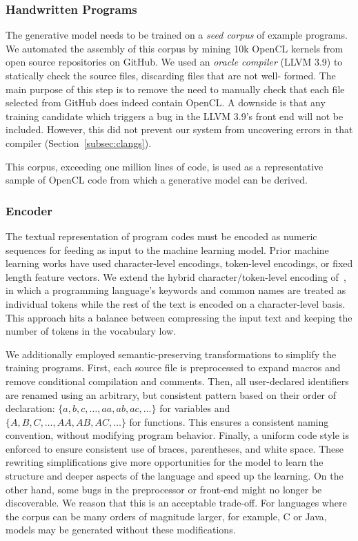 \subsubsection{Handwritten Programs}

The generative model needs to be trained on a \emph{seed corpus} of example
programs. We automated the assembly of this corpus by mining 10k OpenCL kernels
from open source repositories on GitHub. We used an \emph{oracle compiler} (LLVM
3.9) to statically check the source files, discarding files that are not well-
formed. The main purpose of this step is to remove the need to manually check
that each file selected from GitHub does indeed contain OpenCL. A downside is
that any training candidate which triggers a bug in the LLVM 3.9's front end
will not be included. However, this did not prevent our system from uncovering
errors in that compiler (Section~\ref{subsec:clangs}).

This corpus, exceeding one million lines of code, is used as a representative
sample of OpenCL code from which a generative model can be derived.

\subsubsection{Encoder}

The textual representation of program codes must be encoded as numeric sequences
for feeding as input to the machine learning model. Prior machine learning works
have used character-level encodings, token-level encodings, or fixed length
feature vectors. We extend the hybrid character/token-level encoding
of~\cite{Cummins2017b}, in which a programming language's keywords and common
names are treated as individual tokens while the rest of the text is encoded on
a character-level basis. This approach hits a balance between compressing the
input text and keeping the number of tokens in the vocabulary low.

We additionally employed semantic-preserving transformations to simplify the
training programs. First, each source file is preprocessed to expand macros and
remove conditional compilation and comments. Then, all user-declared identifiers
are renamed using an arbitrary, but consistent pattern based on their order of
declaration: $\{a,\allowbreak b,\allowbreak c,\allowbreak \ldots,\allowbreak
aa,\allowbreak ab,\allowbreak ac,\allowbreak \ldots\}$ for variables and
$\{A,\allowbreak B,\allowbreak C,\allowbreak \ldots,\allowbreak AA,\allowbreak
AB,\allowbreak AC,\allowbreak \ldots\}$ for functions. This ensures a consistent
naming convention, without modifying program behavior. Finally, a uniform code
style is enforced to ensure consistent use of braces, parentheses, and white
space. These rewriting simplifications give more opportunities for the model to
learn the structure and deeper aspects of the language and speed up the
learning. On the other hand, some bugs in the preprocessor or front-end might no
longer be discoverable. We reason that this is an acceptable trade-off. For
languages where the corpus can be many orders of magnitude larger, for example,
C or Java, models may be generated without these modifications.

